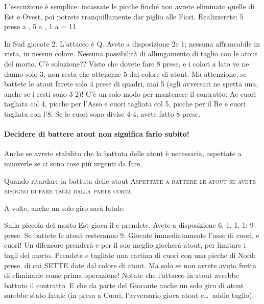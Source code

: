 \documentclass[../corsofiori.tex]{subfiles}
\begin{document}
L’esecuzione
è semplice: incassate le picche finché non avrete eliminato quelle di Est e Ovest, poi potrete tranquillamente dar
piglio alle Fiori.  Realizzerete: 5 prese a \Sp, 5 a \Cl, 1 a \He = 11. 

\newgame
{}
\leftupper{\boardtext*}%
{\dealertext\quad}{\vulnertext}

\showAll*

In Sud giocate 2\Di. L’attacco è Q\He.  Avete a disposizione 2\Sp e 1\He; nessuna affrancabile in vista, in nessun
colore. Nessuna possibilità di allungamento di taglio con le atout del morto. C’è soluzione?? Visto che dovete fare
8 prese, e i colori a lato ve ne danno solo 3, non resta che ottenerne 5 dal colore di atout. Ma attenzione, se battete
  le atout farete solo 4 prese di quadri, mai 5 (agli avversari ne spetta una, anche se i resti sono 3-2)! C’è un solo
  modo per mantenere il contratto: A\He e cuori tagliata col 4\Di, picche per l’Asso e cuori tagliata col 5\Di, picche
  per il Re e cuori tagliata con l’8\Di. Se le cuori sono divise 4-4, avete fatto 8 prese.

\paragraph{Decidere di battere atout non significa farlo subito!}
Anche se avrete stabilito che la battuta delle atout è necessaria, aspettate a
muoverle se ci sono cose più urgenti da fare.

\begin{regola}{Quando ritardare la battuta delle atout}
    \textsc{Aspettate a battere le atout se avete bisogno di fare tagli dalla parte corta}

\end{regola}

A volte, anche un solo giro sarà fatale.


\newgame
{}
\leftupper{\boardtext*}%
{\dealertext\quad}{\vulnertext}
\rightlower[2ex]{}{}{\lead: 2\Cl}

\showAll*

Sulla piccola del morto Est gioca il \Ten e prendete. Avete a disposizione 6\Sp, 1\He, 1\Di,
1\Cl: 9 prese. Se battete le atout resteranno 9. Giocate immediatamente l’asso di cuori, e cuori! Un difensore prenderà
  e per il suo meglio giocherà atout, per limitare i tagli del morto. Prendete e tagliate una cartina di cuori con una
  picche di Nord: \Ten prese, di cui SETTE date dal colore di atout. Ma solo se non avrete avuto fretta di eliminarle
  come prima operazione! Notate che l’attacco in atout avrebbe battuto il contratto. E che da parte del Giocante anche
  un solo giro di atout sarebbe stato fatale (in presa a Cuori, l’avversario gioca atout e\ldots\ addio taglio).
\end{document}
